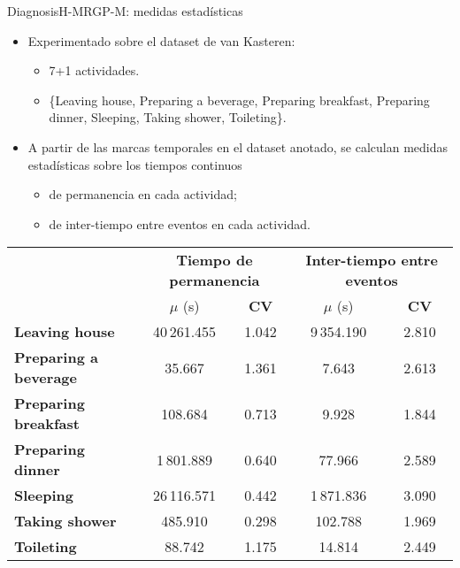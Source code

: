 \documentclass[9pt, handout]{beamer}
\begin{document}
      \begin{frame}{Diagnosis}{H-MRGP-M: medidas estadísticas}
        \pause
        \begin{itemize}
          \item Experimentado sobre el dataset de van Kasteren:
          \begin{itemize}
            \item 7+1 actividades.
            \item \{Leaving house, Preparing a beverage, Preparing breakfast, Preparing dinner, Sleeping, Taking shower, Toileting\}.
          \end{itemize}
          \pause
          \item A partir de las marcas temporales en el dataset anotado, se calculan medidas estadísticas sobre los tiempos continuos
          \begin{itemize}
            \item de permanencia en cada actividad;
            \item de inter-tiempo entre eventos en cada actividad.
          \end{itemize}
        \end{itemize}
        
        \pause
    		\begin{table}[h!]
    			\centering
    			\small
    			\setlength{\tabcolsep}{5pt}
    			\def\arraystretch{0.75}
    			\begin{tabular}{| l | c | c || c | c |}
    				\hline
    				& \multicolumn{2}{|c||}{\bf Tiempo de permanencia}& \multicolumn{2}{|c|}{\bf Inter-tiempo entre eventos}\\
    				\cline{2-5}
    				& $\mu$ (s) & {\bf CV} & $\mu$ (s) & {\bf CV}\\
    				\hline
    				{\bf Leaving house} & 40\,261.455 & 1.042 & 9\,354.190 & 2.810 \\ \hline
    				{\bf Preparing a beverage} &  35.667 & 1.361 & 7.643 & 2.613\\ \hline
    				{\bf Preparing breakfast} &  108.684 & 0.713 & 9.928 & 1.844\\ \hline
    				{\bf Preparing dinner} &  1\,801.889 & 0.640 & 77.966 & 2.589\\ \hline
    				{\bf Sleeping} &  26\,116.571 & 0.442 & 1\,871.836 & 3.090\\ \hline
    				{\bf Taking shower} &  485.910 & 0.298 & 102.788 & 1.969\\ \hline
    				{\bf Toileting} &  88.742 & 1.175 & 14.814 & 2.449\\ 
    				\hline
      		\end{tabular}
    		\end{table}
      \end{frame}
      
\end{document}
